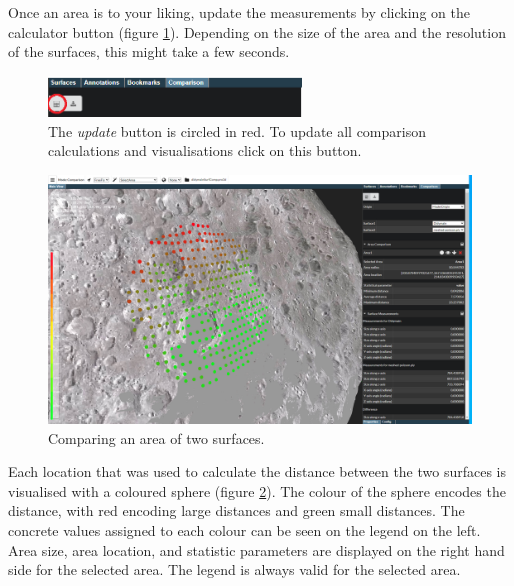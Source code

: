 Once an area is to your liking, update the measurements by clicking on the calculator button (figure \ref{surfaceComparisonAreaUpdButton.PNG}). Depending on the size of the area and the resolution of the surfaces, this might take a few seconds.

\begin{figure}[h]
	\centering
	\includegraphics[width=0.6\textwidth]{pics/surfaceComparisonAreaUpdButton.PNG}
	\caption[The update button.]{The \emph{update} button is circled in red. To update all comparison calculations and visualisations click on this button.}
	\label{surfaceComparisonAreaUpdButton.PNG}
\end{figure}

\begin{figure}[h]
	\centering
	\includegraphics[width=1.0\textwidth]{pics/surfaceComparisonArea3DView1.PNG}
	\caption[Comparing an area of two surfaces.]{Comparing an area of two surfaces.}
	\label{surfaceComparisonArea3DView1.PNG}
\end{figure}

Each location that was used to calculate the distance between the two surfaces is visualised with a coloured sphere (figure \ref{surfaceComparisonArea3DView1.PNG}). The colour of the sphere encodes the distance, with red encoding large distances and green small distances. The concrete values assigned to each colour can be seen on the legend on the left. Area size, area location, and statistic parameters are displayed on the right hand side for the selected area. The legend is always valid for the selected area.

